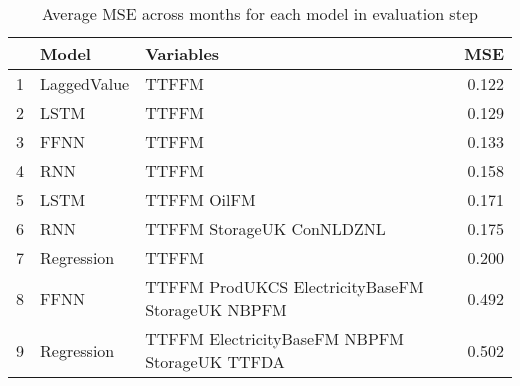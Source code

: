 \begin{table}[ht]
\centering
\begin{tabular}{rllr}
  \hline
 & Model & Variables & MSE \\ 
  \hline
1 & LaggedValue & TTFFM  & 0.122 \\ 
  2 & LSTM & TTFFM  & 0.129 \\ 
  3 & FFNN & TTFFM  & 0.133 \\ 
  4 & RNN & TTFFM  & 0.158 \\ 
  5 & LSTM & TTFFM OilFM & 0.171 \\ 
  6 & RNN & TTFFM StorageUK ConNLDZNL & 0.175 \\ 
  7 & Regression & TTFFM  & 0.200 \\ 
  8 & FFNN & TTFFM ProdUKCS ElectricityBaseFM StorageUK NBPFM & 0.492 \\ 
  9 & Regression & TTFFM ElectricityBaseFM NBPFM StorageUK TTFDA & 0.502 \\ 
   \hline
\end{tabular}
\caption{Average MSE across months for each model in evaluation step} 
\label{tab:level.eval.short}
\end{table}

